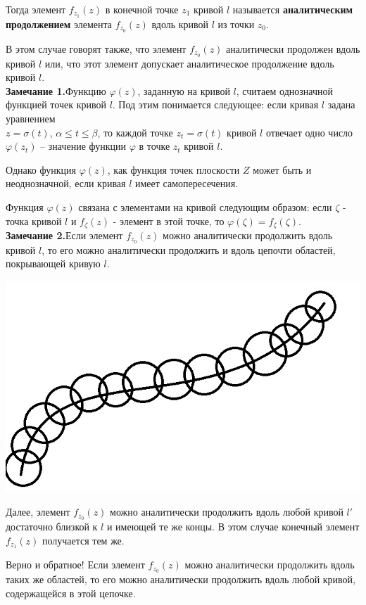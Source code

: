 \documentclass[a4paper, 12pt]{report}
\begin{document}
Тогда элемент $f_{z_1}(z)$ в конечной точке $z_1$ кривой $l$ называется \textbf{аналитическим продолжением} элемента $f_{z_0}(z)$ вдоль кривой $l$ из точки $z_0$.

В этом случае говорят также, что элемент $f_{z_0}(z)$ аналитически продолжен вдоль кривой $l$ или, что этот элемент допускает аналитическое продолжение вдоль кривой $l$.\\


\textbf{Замечание 1.}\quad Функцию $\varphi(z)$, заданную на кривой $l$, считаем однозначной функцией точек кривой $l$. Под этим понимается следующее: если кривая $l$ задана уравнением \\ $z=\sigma(t)$, $\alpha \leqslant t \leqslant \beta$, то каждой точке $z_t = \sigma(t)$ кривой $l$ отвечает одно число $\varphi(z_t)$ -- значение функции $\varphi$ в точке $z_t$ кривой $l$.

Однако функция $\varphi(z)$, как функция точек плоскости $Z$ может быть и неоднозначной, если кривая $l$ имеет самопересечения.

Функция $\varphi(z)$ связана с элементами на кривой следующим образом: если $\zeta$ - точка кривой $l$ и $f_{\zeta}(z)$ - элемент в этой точке, то $\varphi(\zeta) =  f_{\zeta}(\zeta)$. \\


\textbf{Замечание 2.}\quad Если элемент $f_{z_0}(z)$ можно аналитически продолжить вдоль кривой $l$, то его можно аналитически продолжить и вдоль цепочти областей, покрывающей кривую $l$.

\begin{center}
    \includegraphics[width=8 cm]{continueCurve/circles.png} 
\end{center}

Далее, элемент $f_{z_0}(z)$ можно аналитически продолжить вдоль любой кривой $l'$ достаточно близкой к $l$ и имеющей те же концы. В этом случае конечный элемент $f_{z_1}(z)$ получается тем же.

Верно и обратное! Если элемент $f_{z_0}(z)$ можно аналитически продолжить вдоль таких же областей, то его можно аналитически продолжить вдоль любой кривой, содержащейся  в этой цепочке.\\
\end{document}
